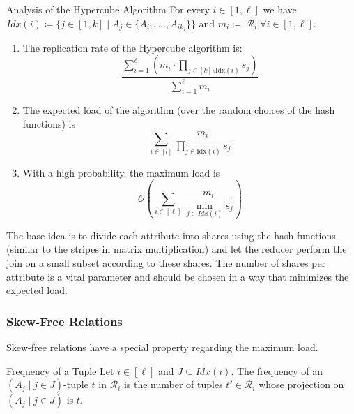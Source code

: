\documentclass[english]{panikzettel}
\begin{document}
\begin{halfboxr}
\vspace{-\baselineskip}

\begin{theo}{Analysis of the Hypercube Algorithm}
For every $i\in[1,\ell]$ we have $Idx(i) \coloneqq \{j\in [1,k] \mid A_j\in \{A_{i1},...,A_{ik_{i}} \} \}$ and $m_i\coloneqq | \mathcal{R}_i| \forall i\in [1,\ell]$.
\begin{enumerate}[leftmargin=*]
    \item The replication rate of the Hypercube algorithm is:
$$
\frac{\displaystyle \sum_{i=1}^\ell \left( m_i\cdot \prod_{j \in [k]\setminus \text{Idx}(i)} s_j \right)}{\displaystyle \sum_{i = 1}^\ell m_i }
$$
	\item The expected load of the algorithm (over the random choices of the hash functions) is
$$
\sum_{i \in [l]} \frac{m_i}{\prod_{j \in \text{Idx}(i)} s_j}
$$
	\item With a high probability, the maximum load is
	\[
	\mathcal{O}\left( \sum_{i\in[\ell]} \frac{m_i}{\min_{j\in Idx(i)} s_j} \right)
	\]
\end{enumerate}
\end{theo}

\end{halfboxr}

The base idea is to divide each attribute into shares using the hash functions (similar to the stripes in matrix multiplication) and let the reducer perform the join on a small subset according to these shares.
The number of shares per attribute is a vital parameter and should be chosen in a way that minimizes the expected load.


\subsubsection{Skew-Free Relations}
Skew-free relations have a special property regarding the maximum load.

\begin{defi}{Frequency of a Tuple}
Let $i\in[\ell]$ and $J\subseteq Idx(i)$. The frequency of an $(A_j\mid j\in J)$-tuple $t$ in $\mathcal{R}_i$ is the number of tuples $t'\in\mathcal{R}_i$ whose projection on $(A_j\mid j\in J)$ is $t$.
\end{defi}
\end{document}
